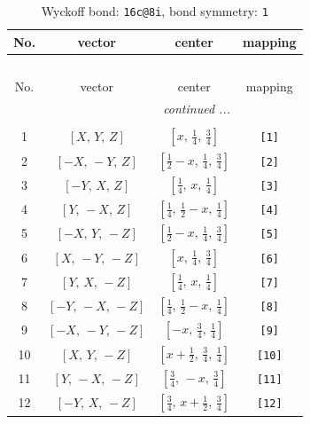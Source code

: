 \documentclass[fleqn,8pt]{jsarticle}
\begin{document}
\begin{longtable}{cccc}
\caption{Wyckoff bond: {\tt 16c@8i}, bond symmetry: {\tt 1}}
 \\
 \hline \hline
No. & vector & center & mapping \\ \hline \endfirsthead

\multicolumn{3}{l}{\tablename\ \thetable{}} \\
 \hline \hline
No. & vector & center & mapping \\ \hline \endhead

 \hline \hline
\multicolumn{3}{r}{\footnotesize\it continued ...} \\ \endfoot

 \hline \hline
\multicolumn{3}{r}{} \\ \endlastfoot

1 & $\left[ X,\, Y,\, Z \right]$ & $\left[ x,\, \frac{1}{4},\, \frac{3}{4} \right]$ & {\tt [1]} \\ \hline
2 & $\left[ - X,\, - Y,\, Z \right]$ & $\left[ \frac{1}{2} - x,\, \frac{1}{4},\, \frac{3}{4} \right]$ & {\tt [2]} \\ \hline
3 & $\left[ - Y,\, X,\, Z \right]$ & $\left[ \frac{1}{4},\, x,\, \frac{1}{4} \right]$ & {\tt [3]} \\ \hline
4 & $\left[ Y,\, - X,\, Z \right]$ & $\left[ \frac{1}{4},\, \frac{1}{2} - x,\, \frac{1}{4} \right]$ & {\tt [4]} \\ \hline
5 & $\left[ - X,\, Y,\, - Z \right]$ & $\left[ \frac{1}{2} - x,\, \frac{1}{4},\, \frac{3}{4} \right]$ & {\tt [5]} \\ \hline
6 & $\left[ X,\, - Y,\, - Z \right]$ & $\left[ x,\, \frac{1}{4},\, \frac{3}{4} \right]$ & {\tt [6]} \\ \hline
7 & $\left[ Y,\, X,\, - Z \right]$ & $\left[ \frac{1}{4},\, x,\, \frac{1}{4} \right]$ & {\tt [7]} \\ \hline
8 & $\left[ - Y,\, - X,\, - Z \right]$ & $\left[ \frac{1}{4},\, \frac{1}{2} - x,\, \frac{1}{4} \right]$ & {\tt [8]} \\ \hline
9 & $\left[ - X,\, - Y,\, - Z \right]$ & $\left[ - x,\, \frac{3}{4},\, \frac{1}{4} \right]$ & {\tt [9]} \\ \hline
10 & $\left[ X,\, Y,\, - Z \right]$ & $\left[ x + \frac{1}{2},\, \frac{3}{4},\, \frac{1}{4} \right]$ & {\tt [10]} \\ \hline
11 & $\left[ Y,\, - X,\, - Z \right]$ & $\left[ \frac{3}{4},\, - x,\, \frac{3}{4} \right]$ & {\tt [11]} \\ \hline
12 & $\left[ - Y,\, X,\, - Z \right]$ & $\left[ \frac{3}{4},\, x + \frac{1}{2},\, \frac{3}{4} \right]$ & {\tt [12]} \\ \hline

\end{longtable}
\end{document}
